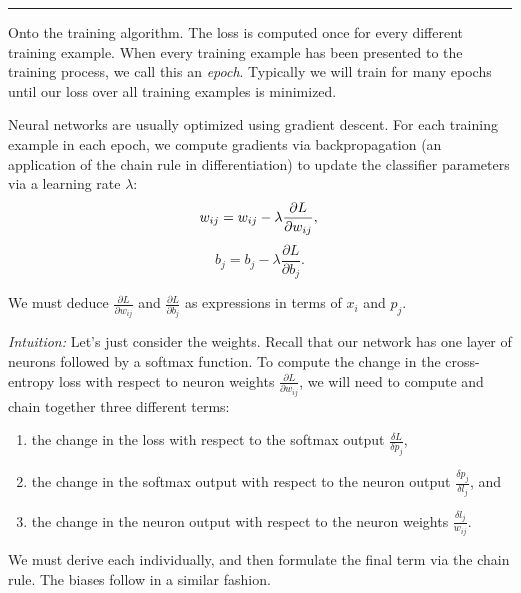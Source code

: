 \hspace{\fill}\rule{0.5\linewidth}{.5pt}\hspace{\fill}

Onto the training algorithm. The loss is computed once for every different training example. When every training example has been presented to the training process, we call this an \emph{epoch}. Typically we will train for many epochs until our loss over all training examples is minimized.

Neural networks are usually optimized using gradient descent. For each training example in each epoch, we compute gradients via backpropagation (an application of the chain rule in differentiation) to update the classifier parameters via a learning rate $\lambda$:
\begin{equation}
    w_{ij} = w_{ij} - \lambda\frac{\partial L}{\partial w_{ij}}, \\
\end{equation}
\begin{equation}
    b_j = b_j - \lambda\frac{\partial L}{\partial b_j}.
\end{equation}

We must deduce $\frac{\partial L}{\partial w_{ij}}$ and $\frac{\partial L}{\partial b_j}$ as expressions in terms of $x_i$ and $p_j$.

\emph{Intuition:} Let's just consider the weights. Recall that our network has one layer of neurons followed by a softmax function. To compute the change in the cross-entropy loss with respect to neuron weights $\frac{\partial L}{\partial w_{ij}}$, we will need to compute and chain together three different terms:
\begin{enumerate}
    \itemsep0em
          \listparindent0em
          \topsep0em
          \parsep0em
          \partopsep0em
    \item the change in the loss with respect to the softmax output $\frac{\delta L}{\delta p_j}$,
    \item the change in the softmax output with respect to the neuron output $\frac{\delta p_j}{\delta l_j}$, and
    \item the change in the neuron output with respect to the neuron weights $\frac{\delta l_j}{w_{ij}}$.
\end{enumerate}
We must derive each individually, and then formulate the final term via the chain rule. The biases follow in a similar fashion.

